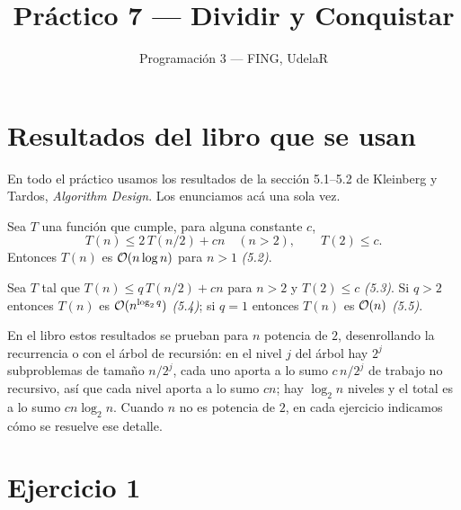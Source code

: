 

\newcommand{\Equiv}{\textsc{Equiv}}
\newcommand{\nil}{\bot}
\newcommand{\ind}[1]{\mathbf{1}_{\{#1\}}}

\title{Práctico 7 --- Dividir y Conquistar}
\author{Programación 3 --- FING, UdelaR}
\date{}


\maketitle

\section*{Resultados del libro que se usan}

En todo el práctico usamos los resultados de la sección 5.1--5.2 de Kleinberg y Tardos,
\emph{Algorithm Design}. Los enunciamos acá una sola vez.

\begin{teorema}[K\&T (5.1) y (5.2)]\label{t:52}
Sea $T$ una función que cumple, para alguna constante $c$,
\[
T(n)\le 2\,T(n/2)+cn \quad (n>2),\qquad T(2)\le c. \tag{5.1}
\]
Entonces $T(n)$ es $\mathcal{O}(n\log n)$ para $n>1$ \emph{(5.2)}.
\end{teorema}

\begin{teorema}[K\&T (5.3), (5.4), (5.5)]\label{t:q}
Sea $T$ tal que $T(n)\le q\,T(n/2)+cn$ para $n>2$ y $T(2)\le c$ \emph{(5.3)}. Si $q>2$
entonces $T(n)$ es $\mathcal{O}(n^{\log_2 q})$ \emph{(5.4)}; si $q=1$ entonces $T(n)$ es
$\mathcal{O}(n)$ \emph{(5.5)}.
\end{teorema}

En el libro estos resultados se prueban para $n$ potencia de $2$, desenrollando la
recurrencia o con el árbol de recursión: en el nivel $j$ del árbol hay $2^j$
subproblemas de tamaño $n/2^j$, cada uno aporta a lo sumo $c\,n/2^j$ de trabajo no
recursivo, así que cada nivel aporta a lo sumo $cn$; hay $\log_2 n$ niveles y el total es
a lo sumo $cn\log_2 n$. Cuando $n$ no es potencia de $2$, en cada ejercicio indicamos
cómo se resuelve ese detalle.

\section{Ejercicio 1}

